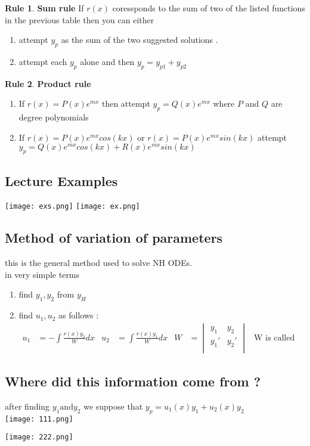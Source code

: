 \documentclass[11pt]{article}
\theoremstyle{definition}
\newtheorem{reg}{Rule}
\begin{document}
\begin{reg}
\textbf{Sum rule}
If $r(x)$ coressponds to the sum of two of the listed functions in the previous table then you can either \begin{enumerate}
    \item attempt $y_p$ as the sum of the two suggested solutions .
    \item attempt each $y_p$ alone and then $y_p = y_{p1} + y_{p2}$
\end{enumerate}
\end{reg}
\begin{reg}
\textbf{Product rule}
\begin{enumerate}
    \item If $r(x) = P(x) e^{mx}$ then attempt $y_p = Q(x) e^{mx}$  where $P$ and $Q$ are degree polynomials
    \item If $r(x) = P(x) e^{mx} cos(kx)$ or $r(x) = P(x) e^{mx} sin(kx)$ attempt $y_p = Q(x) e^{mx} cos(kx) + R(x) e^{mx} sin(kx)$
\end{enumerate}
\end{reg}
\subsection{Lecture Examples}
\begin{center}
    \texttt{[image: exs.png]}
    \texttt{[image: ex.png]}
\end{center}
\subsection{Method of variation of parameters}
this is the general method used to solve NH ODEs.\\
in very simple terms 
\begin{enumerate}
    \item find $y_1, y_2$ from $y_H$
    \item find $u_1,u_2$ as follows :
    \begin{align*}
        u_1 &= -\int \frac{r(x) y_2}{W} dx & u_2 &= \int \frac{r(x) y_1}{W} dx&
        W &= \begin{vmatrix}
        y_1&y_2\\
        y_1'&y_2'\\
            \end{vmatrix}
           & \text{W is called the Wronskian}
    \end{align*}
\end{enumerate}
\subsection{Where did this information come from ?}
after finding $y_1 \text{and} y_2$ we suppose that $y_p = u_1(x)y_1 + u_2(x)y_2$\\
\texttt{[image: 111.png]}\\
\begin{center}
    \texttt{[image: 222.png]}
\end{center}
\end{document}
